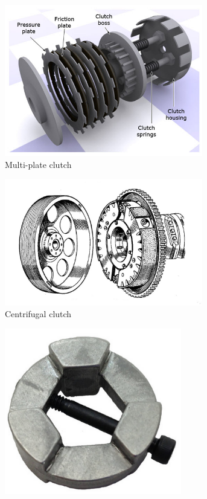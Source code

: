 \begin{figure}[H]
	\begin{subfigure}[b]{.32\linewidth}
		\includegraphics[width=0.95\textwidth]{imgs/plate_clutch.jpeg}
		\caption{Multi-plate clutch}
	\end{subfigure}\begin{subfigure}[b]{.32\linewidth}
		\includegraphics[width=0.95\textwidth]{imgs/centrif_clutch.jpeg}
		\caption{Centrifugal clutch}
	\end{subfigure}\begin{subfigure}[b]{.32\linewidth}
		\includegraphics[width=0.85\textwidth]{imgs/shifting_dog.png}

\end{subfigure}
\end{figure}
